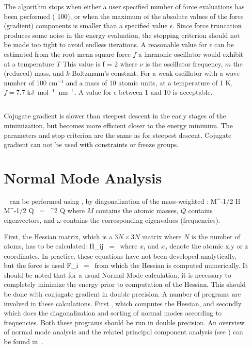 The algorithm stops when either a user specified number of force 
evaluations has been performed ({\eg} 100), or when the maximum of the absolute
values of the force (gradient) components is smaller than a specified
value $\epsilon$.
Since force truncation produces some noise in the
energy evaluation, the stopping criterion should not be made too tight
to avoid endless iterations. A reasonable value for $\epsilon$ can be
estimated from the root mean square force $f$ a harmonic oscillator would exhibit at a
temperature $T$ This value is 
\beq
  f = 2 \pi \nu {}
\eeq
where $\nu$ is the oscillator frequency, $m$ the (reduced) mass, and
$k$ Boltzmann's constant. For a weak oscillator with a wave number of
100 cm$^{-1}$ and a mass of 10 atomic units, at a temperature of 1 K,
$f=7.7$ kJ~mol$^{-1}$~nm$^{-1}$. A value for $\epsilon$ between 1 and
10 is acceptable.   

\subsection{}
Cojugate gradient is slower than steepest descent in the early stages of
the minimization, but becomes more efficient closer to the energy minimum.
The parameters and stop criterion are the same as for steepest descent.
Cojugate gradient can not be used with constraints or freeze groups.


\section{Normal Mode Analysis}
~\cite{Levitt83,Go83,BBrooks83b} 
can be performed using {\gromacs}, by diagonalization of the mass-weighted
:
\beq
M^{-1/2} H M^{-1/2} Q   ~=~     \omega^2 Q
\eeq
where $M$ contains the atomic masses, $Q$ contains eigenvectors, and $\omega$
contains the corresponding eigenvalues (frequencies).

First, the Hessian matrix, which is a $3N \times 3N$ matrix where $N$
is the number of atoms, has to be calculated:
\beq
H_{ij}  ~=~     
\eeq
where $x_i$ and $x_j$ denote the atomic x,y or z coordinates.
In practice, these equations have not been developed analytically, but
the force is used
\beq
F_i     ~=~     
\eeq
from which the Hessian is computed numerically. It should be noted that
for a usual Normal Mode calculation, it is necessary to completely minimize 
the energy prior to computation of the Hessian. This should be done
with conjugate gradient in double precision.
A number of {\gromacs} programs are involved in these
calculations. First {\tt {}}, which computes the Hessian,
and secondly {\tt {}} which does the diagonalization and
sorting of normal modes according to frequencies. Both these programs
should be run in double precision. An overview of normal mode analysis
and the related principal component analysis (see )
can be found in~\cite{Hayward95b}.

